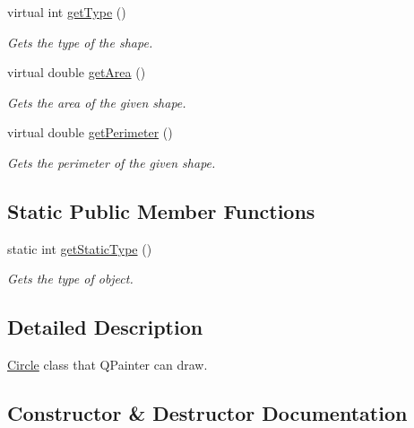 \begin{DoxyCompactItemize}
virtual int \hyperlink{classCircle_ac13b29eb5095b4fd8e6c25ba50dd9131}{get\+Type} ()
\begin{DoxyCompactList}\small\item\em Gets the type of the shape. \end{DoxyCompactList}\item 
virtual double \hyperlink{classCircle_ae770cbdb3a0148a9db411fb3b0f87b9a}{get\+Area} ()
\begin{DoxyCompactList}\small\item\em Gets the area of the given shape. \end{DoxyCompactList}\item 
virtual double \hyperlink{classCircle_af9a14f66b467788f8395ea587357a93f}{get\+Perimeter} ()
\begin{DoxyCompactList}\small\item\em Gets the perimeter of the given shape. \end{DoxyCompactList}\end{DoxyCompactItemize}
\subsection*{Static Public Member Functions}
\begin{DoxyCompactItemize}
\item 
static int \hyperlink{classCircle_ac5e287c2511f325888d340b6555d51b5}{get\+Static\+Type} ()
\begin{DoxyCompactList}\small\item\em Gets the type of object. \end{DoxyCompactList}\end{DoxyCompactItemize}


\subsection{Detailed Description}
\hyperlink{classCircle}{Circle} class that Q\+Painter can draw. 

\subsection{Constructor \& Destructor Documentation}

